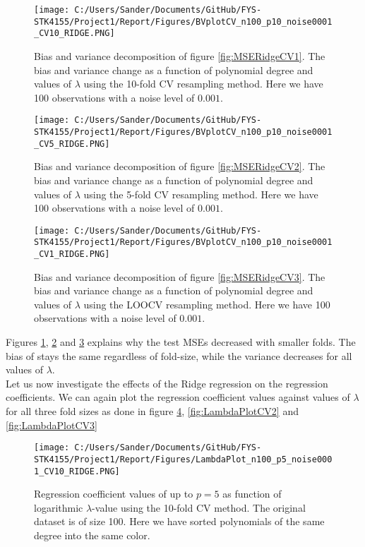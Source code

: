 \documentclass[12pt,a4paper]{article}
\begin{document}
\begin{figure}[H]
\centering
\texttt{[image: C:/Users/Sander/Documents/GitHub/FYS-STK4155/Project1/Report/Figures/BVplotCV\_n100\_p10\_noise0001\_CV10\_RIDGE.PNG]}
\caption{\label{fig:BVRidgeCV1} Bias and variance decomposition of figure \ref{fig:MSERidgeCV1}. The bias and variance change as a function of polynomial degree and values of $\lambda$ using the 10-fold CV resampling method. Here we have 100 observations with a noise level of $0.001$.}
\end{figure}

\begin{figure}[H]
\centering
\texttt{[image: C:/Users/Sander/Documents/GitHub/FYS-STK4155/Project1/Report/Figures/BVplotCV\_n100\_p10\_noise0001\_CV5\_RIDGE.PNG]}
\caption{\label{fig:BVRidgeCV2} Bias and variance decomposition of figure \ref{fig:MSERidgeCV2}. The bias and variance change as a function of polynomial degree and values of $\lambda$ using the 5-fold CV resampling method. Here we have 100 observations with a noise level of $0.001$.}
\end{figure}

\begin{figure}[H]
\centering
\texttt{[image: C:/Users/Sander/Documents/GitHub/FYS-STK4155/Project1/Report/Figures/BVplotCV\_n100\_p10\_noise0001\_CV1\_RIDGE.PNG]}
\caption{\label{fig:BVRidgeCV3} Bias and variance decomposition of figure \ref{fig:MSERidgeCV3}. The bias and variance change as a function of polynomial degree and values of $\lambda$ using the LOOCV resampling method. Here we have 100 observations with a noise level of $0.001$.}
\end{figure}

\noindent Figures \ref{fig:BVRidgeCV1}, \ref{fig:BVRidgeCV2} and \ref{fig:BVRidgeCV3} explains why the test MSEs decreased with smaller folds. The bias of stays the same regardless of fold-size, while the variance decreases for all values of $\lambda$. 
\\
Let us now investigate the effects of the Ridge regression on the regression coefficients. We can again plot the regression coefficient values against values of $\lambda$ for all three fold sizes as done in figure \ref{fig:LambdaPlotCV1}, \ref{fig:LambdaPlotCV2} and \ref{fig:LambdaPlotCV3}

\begin{figure}[H]
\centering
\texttt{[image: C:/Users/Sander/Documents/GitHub/FYS-STK4155/Project1/Report/Figures/LambdaPlot\_n100\_p5\_noise0001\_CV10\_RIDGE.PNG]}
\caption{\label{fig:LambdaPlotCV1} Regression coefficient values of up to $p = 5$ as function of logarithmic $\lambda$-value using the 10-fold CV method. The original dataset is of size 100. Here we have sorted polynomials of the same degree into the same color.}
\end{figure}
\end{document}
